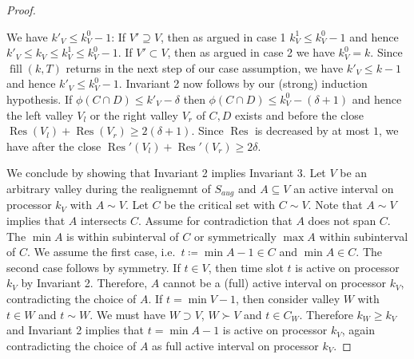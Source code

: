 \documentclass[a4paper]{article}
\DeclareMathOperator{\fillop}{fill}
\DeclareMathOperator{\res}{Res}
\begin{document}
\begin{proof}
\begin{description}
      We have $k'_V \leq k^0_V - 1$:
      If $V' \supseteq V$, then as argued in case 1 $k^1_V \leq k^0_V - 1$ and hence $k'_V \leq k_V \leq k^1_V \leq k^0_V -1$.
      If $V' \subset V$, then as argued in case 2 we have $k^0_V = k$.
      Since $\fillop(k, T)$ returns in the next step of our case assumption, we have $k'_V \leq k - 1$ and hence $k'_V \leq k^0_V -1$.
      Invariant 2 now follows by our (strong) induction hypothesis.
      If $\phi(C \cap D) \leq k'_V - \delta$ then $\phi(C \cap D) \leq k^0_V - (\delta + 1)$ and hence the left valley $V_l$ or the right valley $V_r$ of $C, D$ exists and before the close $\res(V_l) + \res(V_r) \geq 2 (\delta + 1)$.
      Since $\res$ is decreased by at most $1$, we have after the close $\res'(V_l) + \res'(V_r) \geq 2 \delta$.
  \end{description}

  We conclude by showing that Invariant 2 implies Invariant 3.
  Let $V$ be an arbitrary valley during the realignemnt of $S_{aug}$ and $A \subseteq V$ an active interval on processor $k_V$ with $A \sim V$.
  Let $C$ be the critical set with $C \sim V$.
  Note that $A \sim V$ implies that $A$ intersects $C$.
  Assume for contradiction that $A$ does not span $C$.
  The $\min A$ is within subinterval of $C$ or symmetrically $\max A$ within subinterval of $C$.
  We assume the first case, i.e.\ $t\coloneqq \min A - 1 \in C$ and $\min A \in C$.
  The second case follows by symmetry.
  If $t \in V$, then time slot $t$ is active on processor $k_V$ by Invariant 2.
  Therefore, $A$ cannot be a (full) active interval on processor $k_V$, contradicting the choice of $A$.
  If $t = \min V-1$, then consider valley $W$ with $t \in W$ and $t \sim W$.
  We must have $W \supset V$, $W \succ V$ and $t \in C_W$.
  Therefore $k_W \geq k_V$ and Invariant 2 implies that $t = \min A - 1$ is active on processor $k_V$, again contradicting the choice of $A$ as full active interval on processor $k_V$.
\end{proof}
\end{document}
